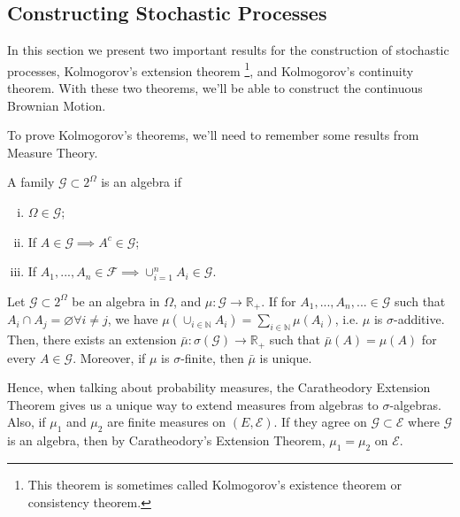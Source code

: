 \subsection{Constructing Stochastic Processes}

In this section we present two important results for the construction
of stochastic processes, Kolmogorov's extension theorem
\footnote{This theorem is sometimes called Kolmogorov's existence theorem or consistency theorem.}, and
Kolmogorov's continuity theorem. With these two theorems, we'll be able to construct the continuous Brownian Motion.

To prove Kolmogorov's theorems, we'll need to remember some results from Measure Theory.

\begin{shaded}
	\begin{definition}[Algebra]
		A family $\mathcal G \subset 2^{\Omega}$ is an algebra if
		\begin{enumerate}[(i)]
			\item $\Omega \in \mathcal G$;
			\item If $ A \in \mathcal G \implies A^c \in \mathcal G$;
			\item If $A_1,..., A_n \in \mathcal F \implies \cup^n_{i=1} A_i \in \mathcal G$.
		\end{enumerate}
	\end{definition}

	\begin{theorem}
		Let $\mathcal G \subset \mathcal 2^\Omega$ be an algebra in $\Omega$,
		and $\mu :\mathcal G \to \mathbb R_+$.
		If for $A_1,...,A_n,... \in \mathcal G$ such that
		$A_i\cap A_j = \varnothing \forall i\neq j$, we have
		$\mu(\cup_{i \in \mathbb N}A_i) = \sum_{i\in\mathbb N} \mu(A_i)$, i.e.
		$\mu$ is $\sigma$-additive. Then, there exists an extension
		$\bar\mu:\sigma(\mathcal G)\to \mathbb R_+$ such that $\bar\mu(A)=\mu(A)$
		for every $A \in \mathcal G$.
		Moreover, if $\mu$ is $\sigma$-finite, then $\bar \mu$ is unique.
		\label{thm:caratheodoryextension}
	\end{theorem}
	Hence, when talking about probability measures, the Caratheodory Extension
	Theorem gives us a unique way to extend measures from algebras to $\sigma$-algebras.
	Also, if $\mu_1$ and $\mu_2$ are finite measures on $(E,\mathcal E)$. If they
	agree on $\mathcal G \subset \mathcal E$ where $\mathcal G$ is an algebra,
	then by Caratheodory's Extension Theorem, $\mu_1 = \mu_2$ on $\mathcal E$.
\end{shaded}

